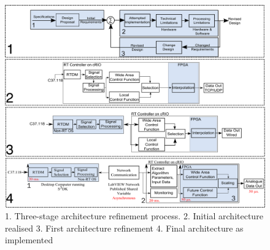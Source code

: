 \documentclass[conference]{IEEEtran}
\begin{document}
\begin{figure}[!b]
\centering
\includegraphics[width=6in]{Abstract_Image}
\caption{1. Three-stage architecture refinement process. 2. Initial architecture realised 3. First architecture refinement 4. Final architecture as implemented}
\label{Reference}
\end{figure}
\end{document}
